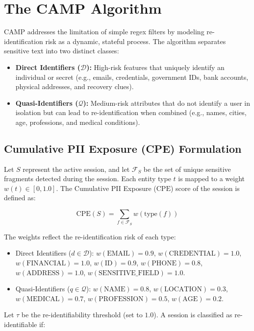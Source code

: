 \documentclass[conference]{IEEEtran}
\begin{document}
\section{The CAMP Algorithm}

CAMP addresses the limitation of simple regex filters by modeling re-identification risk as a dynamic, stateful process. The algorithm separates sensitive text into two distinct classes:
\begin{itemize}
    \item \textbf{Direct Identifiers ($\mathcal{D}$):} High-risk features that uniquely identify an individual or secret (e.g., emails, credentials, government IDs, bank accounts, physical addresses, and recovery clues).
    \item \textbf{Quasi-Identifiers ($\mathcal{Q}$):} Medium-risk attributes that do not identify a user in isolation but can lead to re-identification when combined (e.g., names, cities, age, professions, and medical conditions).
\end{itemize}

\subsection{Cumulative PII Exposure (CPE) Formulation}
Let $S$ represent the active session, and let $\mathcal{F}_S$ be the set of unique sensitive fragments detected during the session. Each entity type $t$ is mapped to a weight $w(t) \in [0, 1.0]$. The Cumulative PII Exposure ($\mathrm{CPE}$) score of the session is defined as:

\begin{equation}
\mathrm{CPE}(S) = \sum_{f \in \mathcal{F}_S} w(\text{type}(f))
\end{equation}

The weights reflect the re-identification risk of each type:
\begin{itemize}
    \item Direct Identifiers ($d \in \mathcal{D}$): $w(\text{EMAIL}) = 0.9$, $w(\text{CREDENTIAL}) = 1.0$, $w(\text{FINANCIAL}) = 1.0$, $w(\text{ID}) = 0.9$, $w(\text{PHONE}) = 0.8$, $w(\text{ADDRESS}) = 1.0$, $w(\text{SENSITIVE\_FIELD}) = 1.0$.
    \item Quasi-Identifiers ($q \in \mathcal{Q}$): $w(\text{NAME}) = 0.8$, $w(\text{LOCATION}) = 0.3$, $w(\text{MEDICAL}) = 0.7$, $w(\text{PROFESSION}) = 0.5$, $w(\text{AGE}) = 0.2$.
\end{itemize}

Let $\tau$ be the re-identifiability threshold (set to $1.0$). A session is classified as re-identifiable if:
\end{document}
